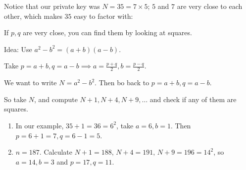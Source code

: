 \documentclass[twoside]{scrartcl}
\begin{document}
Notice that our private key was $N = 35 = 7 \times 5$; $5$ and $7$ are very close to each other, which makes $35$ easy to factor with: 


If $p,q$ are very close, you can find them by looking at squares. 

Idea: Use $a^2 - b^2 = (a+b)(a-b)$. 


Take $p = a+b, q = a-b \implies a = \frac{p+q}{2}, b = \frac{p-q}{2}$. 

We want to write $N = a^2 - b^2$. Then bo back to $p= a + b, q = a-b$. 

So take $N$, and compute $N + 1, N+4,N+9,\dots$ and check if any of them are squares. \\

\begin{examples}
\begin{enumerate}
\item In our example, $35 + 1 = 36 = 6^2$, take $a = 6, b = 1$. Then	 $p = 6 + 1 =7 , q = 6-1 = 5$. 

\item $n = 187$. Calculate $N+1 = 188,\,N+4 = 191,\, N+9 = 196 = 14^2$, so $a = 14, b = 3$ and $p = 17, q =11$.
\end{enumerate} 
\end{examples}
























































\end{document}
